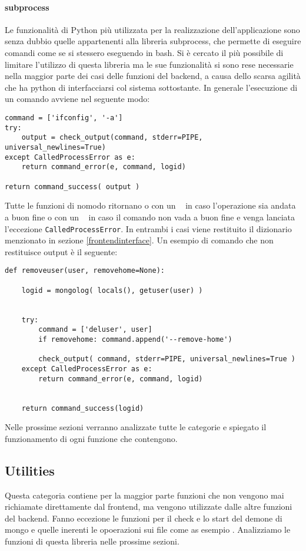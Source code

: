\documentclass[11pt]{article}
\begin{document}
\paragraph{subprocess}\label{subprocess}
Le funzionalità di Python più utilizzata per la realizzazione dell'applicazione sono senza dubbio quelle appartenenti alla libreria subprocess,
che permette di eseguire comandi come se si stessero eseguendo in bash. Si è cercato il più possibile di limitare l'utilizzo di questa libreria
ma le sue funzionalità si sono rese necessarie nella maggior parte dei casi delle funzioni del backend,
a causa dello scarsa agilità che ha python di interfacciarsi col sistema sottostante.
In generale l'esecuzione di un comando avviene nel seguente modo:
\begin{lstlisting}
command = ['ifconfig', '-a']
try:
	output = check_output(command, stderr=PIPE, universal_newlines=True)
except CalledProcessError as e:
	return command_error(e, command, logid)

return command_success( output )
\end{lstlisting}
Tutte le funzioni di nomodo ritornano o con un \texttt{ } in caso l'operazione sia andata a buon fine
o con un \texttt{  } in caso il comando non vada a buon fine e venga lanciata l'eccezione \texttt{CalledProcessError}.
In entrambi i casi viene restituito il dizionario menzionato in sezione \ref{frontendinterface}.
Un esempio di comando che non restituisce output è il seguente:
\begin{lstlisting}
def removeuser(user, removehome=None):
        
    logid = mongolog( locals(), getuser(user) )
    

    try:
        command = ['deluser', user]
        if removehome: command.append('--remove-home') 

        check_output( command, stderr=PIPE, universal_newlines=True )
    except CalledProcessError as e:
        return command_error(e, command, logid)
    
    
    return command_success(logid)
\end{lstlisting}
Nelle prossime sezioni verranno analizzate tutte le categorie e spiegato il funzionamento di ogni funzione che contengono.

\subsection{Utilities}\label{utilities}
Questa categoria contiene per la maggior parte funzioni che non vengono mai richiamate direttamente dal frontend, ma vengono utilizzate
dalle altre funzioni del backend. Fanno eccezione le funzioni per il check e lo start del demone di mongo e quelle inerenti
le opoerazioni sui file come as esempio .
Analizziamo le funzioni di questa libreria nelle prossime sezioni.
\end{document}
